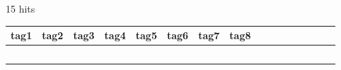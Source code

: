 \documentclass{article}
\begin{document}
15 hits


\begin{table}[H]
	\centering
	\label{my-label}
	\begin{tabular}{|l|l|l|l|l|l|l|l|l|l|l|l|l|l|l|l|}
		\hline
		tag1 & tag2 & tag3 & tag4 & tag5 & tag6 & tag7 & tag8 &  &  &  &  &  &  &  &  \\ \hline
		&      &      &      &      &      &      &      &  &  &  &  &  &  &  &  \\
		
		 & & & & & & & & & & & & & & & \\
		  & & & & & & & & & & & & & & & \\ & & & & & & & & & & & & & & & \\ & & & & & & & & & & & & & & & \\
		
		
		 \hline
 
	\end{tabular}
\end{table}
\end{document}
